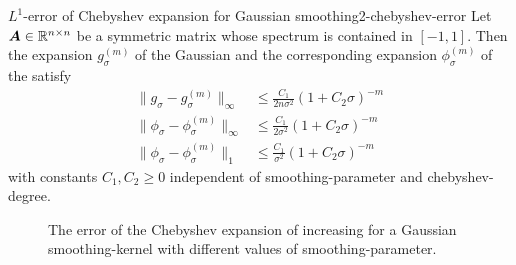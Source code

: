 \begin{lemma}{$L^1$-error of Chebyshev expansion for Gaussian smoothing}{2-chebyshev-error}
    Let $\boldsymbol{A} \in \mathbb{R}^{n \times n}$ be a symmetric matrix whose spectrum
    is contained in $[-1, 1]$. Then the expansion $g_{\sigma}^{(m)}$ of the Gaussian 
    and the corresponding expansion $\phi_{\sigma}^{(m)}$ of the  satisfy
    \begin{align}
        \lVert  g_{\sigma} - g_{\sigma}^{(m)} \rVert _{\infty} &\leq \frac{C_1}{2n\sigma^2}(1 + C_2 \sigma)^{-m}
        \label{equ:2-chebyshev-interpolation-sup-error-kernel} \\
        \lVert  \phi_{\sigma} - \phi_{\sigma}^{(m)} \rVert _{\infty} &\leq \frac{C_1}{2\sigma^2}(1 + C_2 \sigma)^{-m}
        \label{equ:2-chebyshev-interpolation-sup-error} \\
        \lVert  \phi_{\sigma} - \phi_{\sigma}^{(m)} \rVert _1 &\leq \frac{C_1}{\sigma^2}(1 + C_2 \sigma)^{-m}
        \label{equ:2-chebyshev-interpolation-error}
    \end{align}
    with constants $C_1, C_2 \geq 0$ independent of \gls{smoothing-parameter} and \gls{chebyshev-degree}.
\end{lemma}

\begin{figure}[ht]
    \centering
    
    \caption{The error of the Chebyshev expansion of increasing 
    for a Gaussian \gls{smoothing-kernel} with different values of \gls{smoothing-parameter}.}
    \label{fig:2-chebyshev-chebyshev-convergence}
\end{figure}

